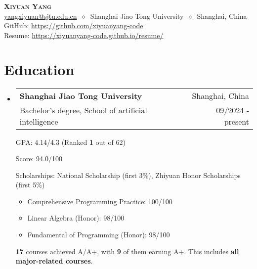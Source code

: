 \documentclass[letterpaper,11pt]{article}
\makeatletter
\newcommand{\cvheading}[4]{
  \vspace{-2pt}\item
    \begin{tabular*}{\textwidth}[t]{l@{\extracolsep{\fill}}r}
      \textbf{#1} & #2 \\
      \small#3 & \small #4 \\
    \end{tabular*}\vspace{-7pt}
}
\newcommand{\cvheadingstart}{\begin{itemize}[leftmargin=0in, label={}]}
\newcommand{\cvheadingend}{\end{itemize}}
\makeatother
\begin{document}
\begin{center}
  \textbf{\LARGE\scshape Xiyuan Yang} \\
  \vspace{1pt}\small
  \href{mailto:yangxiyuan@sjtu.edu.cn}{yangxiyuan@sjtu.edu.cn}
  $\ \diamond\ $
  Shanghai Jiao Tong University
  $\ \diamond\ $
  Shanghai, China
  \\
  GitHub: \href{https://github.com/xiyuanyang-code}{https://github.com/xiyuanyang-code}
  \\
  Resume: \href{https://xiyuanyang-code.github.io/resume}{https://xiyuanyang-code.github.io/resume/}
\end{center}



\section{Education}
\cvheadingstart
\cvheading
{Shanghai Jiao Tong University}{Shanghai, China}
{Bachelor's degree, School of artificial intelligence}{09/2024 - present}

GPA: 4.14/4.3 (Ranked \textbf{1} out of 62)

Score: 94.0/100

Scholarships: National Scholarship (first 3\%), Zhiyuan Honor Scholarships (first 5\%)

\begin{itemize}[nosep]
  \item Comprehensive Programming Practice: 100/100
  \item Linear Algebra (Honor): 98/100
  \item Fundamental of Programming (Honor): 98/100
\end{itemize}

\textbf{17} courses achieved A/A+, with \textbf{9} of them earning A+. This includes \textbf{all major-related courses}.

\cvheadingend
\vspace{-5pt}
\end{document}
